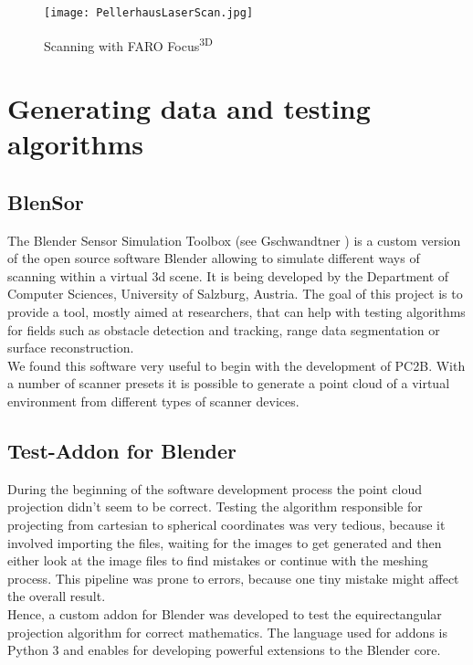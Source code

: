 \begin{figure}[h]
	\centering
	\texttt{[image: PellerhausLaserScan.jpg]}
	\caption{Scanning with FARO Focus\textsuperscript{3D}}
	\label{fig:laser_scanning_on_location}
\end{figure}


\section{Generating data and testing algorithms}

\subsection{BlenSor}

The Blender Sensor Simulation Toolbox (see Gschwandtner \parencite{Gschwandtner11b}) is a custom version of the open source software Blender allowing to simulate different ways of scanning within a virtual 3d scene. It is being developed by the Department of Computer Sciences, University of Salzburg, Austria. The goal of this project is to provide a tool, mostly aimed at researchers, that can help with testing algorithms for fields such as obstacle detection and tracking, range data segmentation or surface reconstruction.\\
We found this software very useful to begin with the development of PC2B. With a number of scanner presets it is possible to generate a point cloud of a virtual environment from different types of scanner devices.

\subsection{Test-Addon for Blender}

During the beginning of the software development process the point cloud projection didn't seem to be correct. Testing the algorithm responsible for projecting from cartesian to spherical coordinates was very tedious, because it involved importing the files, waiting for the images to get generated and then either look at the image files to find mistakes or continue with the meshing process. This pipeline was prone to errors, because one tiny mistake might affect the overall result.\\
Hence, a custom addon for Blender was developed to test the equirectangular projection algorithm for correct mathematics. The language used for addons is Python 3 and enables for developing powerful extensions to the Blender core.


